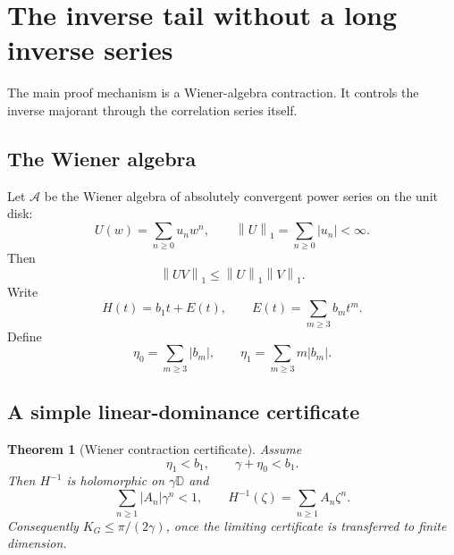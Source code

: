 \documentclass[11pt]{article}
\newtheorem{theorem}{Theorem}[section]
\newcommand{\D}{\mathbb{D}}
\newcommand{\1}{\mathbf{1}}
\newcommand{\norm}[1]{\left\lVert #1\right\rVert}
\newcommand{\abs}[1]{\left\lvert #1\right\rvert}
\begin{document}
\section{The inverse tail without a long inverse series}

The main proof mechanism is a Wiener-algebra contraction.  It controls the inverse majorant through the correlation series itself.

\subsection{The Wiener algebra}

Let \(\mathcal A\) be the Wiener algebra of absolutely convergent power series on the unit disk:
\[
        U(w)=\sum_{n\ge0}u_nw^n,
        \qquad
        \norm{U}_1=\sum_{n\ge0}\abs{u_n}<\infty.
\]
Then
\[
        \norm{UV}_1\le \norm{U}_1\norm{V}_1.
\]
Write
\begin{equation}\label{eq:H-linear-plus-E}
        H(t)=b_1t+E(t),
        \qquad
        E(t)=\sum_{m\ge3}b_mt^m.
\end{equation}
Define
\begin{equation}\label{eq:eta0-eta1}
        \eta_0=\sum_{m\ge3}\abs{b_m},
        \qquad
        \eta_1=\sum_{m\ge3}m\abs{b_m}.
\end{equation}

\subsection{A simple linear-dominance certificate}

\begin{theorem}[Wiener contraction certificate]\label{thm:wiener-simple}
Assume
\begin{equation}\label{eq:simple-conditions}
        \eta_1<b_1,
        \qquad
        \gamma+\eta_0<b_1.
\end{equation}
Then \(H^{-1}\) is holomorphic on \(\gamma\D\) and
\[
        \sum_{n\ge1}\abs{A_n}\gamma^n<1,
        \qquad
        H^{-1}(\zeta)=\sum_{n\ge1}A_n\zeta^n.
\]
Consequently \(K_G\le \pi/(2\gamma)\), once the limiting certificate is transferred to finite dimension.
\end{theorem}
\end{document}
